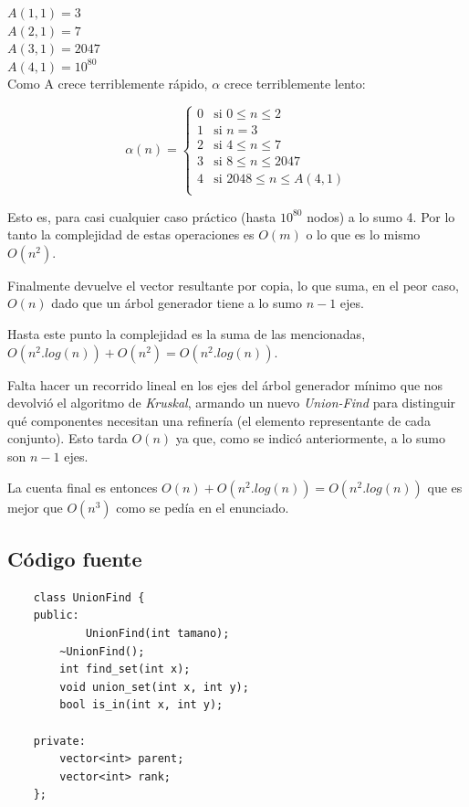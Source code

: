 	$A(1,1) = 3$\\

	$A(2,1) = 7$\\

	$A(3,1) = 2047$\\

	$A(4,1) = 10^{80}$\\

	Como A crece terriblemente r\'apido, $\alpha$ crece terriblemente lento:

	\begin{equation*}
	\alpha(n) = 
	\begin{cases} 
		0  & \mbox{si } 0 \leq n \leq 2 \\[2ex]
		1  & \mbox{si } n = 3 \\[2ex]
		2  & \mbox{si } 4 \leq n \leq 7 \\[2ex]
		3  & \mbox{si } 8 \leq n \leq 2047 \\[2ex]
		4  & \mbox{si } 2048 \leq n \leq A(4,1) \\[2ex]
	\end{cases}
	\end{equation*}

	Esto es, para casi cualquier caso pr\'actico (hasta $10^{80}$ nodos) a lo sumo 4. Por lo tanto la complejidad de estas operaciones es $O(m)$ o lo que es lo mismo $O(n^2)$.

	Finalmente devuelve el vector resultante por copia, lo que suma, en el peor caso, $O(n)$ dado que un \'arbol generador tiene a lo sumo $n-1$ ejes.

	Hasta este punto la complejidad es la suma de las mencionadas, $O(n^2.log(n)) + O(n^2) = O(n^2.log(n))$.

	Falta hacer un recorrido lineal en los ejes del \'arbol generador m\'inimo que nos devolvi\'o el algoritmo de \textit{Kruskal}, armando un nuevo \textit{Union-Find} para distinguir qu\'e componentes necesitan una refiner\'ia (el elemento representante de cada conjunto). Esto tarda $O(n)$ ya que, como se indic\'o anteriormente, a lo sumo son $n-1$ ejes.

	La cuenta final es entonces $O(n) + O(n^2.log(n)) = O(n^2.log(n))$ que es mejor que $O(n^3)$ como se ped\'ia en el enunciado.

\subsection{C\'odigo fuente}

	\begin{codesnippet}
	\begin{verbatim}
    class UnionFind {
    public:
        	UnionFind(int tamano);
        ~UnionFind();
        int find_set(int x);
        void union_set(int x, int y);
        bool is_in(int x, int y);

    private:
        vector<int> parent;
        vector<int> rank;
    };
	\end{verbatim}
	\end{codesnippet}


